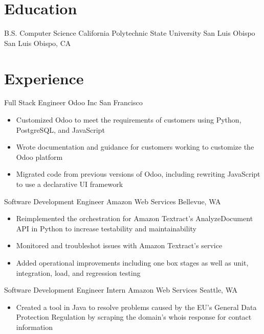 \documentclass[11pt,a4paper,sans,final]{moderncv}
\begin{document}
\makecvtitle
\begin{FlushLeft}
    \section{Education}
        {B.S. Computer Science}
        {California Polytechnic State University San Luis Obispo}
        {San Luis Obispo, CA}
        {}
        {}

    \section{Experience}
        {Full Stack Engineer}
        {Odoo Inc}
        {San Francisco}
        {}
        {
            \begin{itemize}
                \item Customized Odoo to meet the requirements of customers using Python, PostgreSQL, and JavaScript
                \item Wrote documentation and guidance for customers working to customize the Odoo platform
                \item Migrated code from previous versions of Odoo, including rewriting JavaScript to use a declarative UI framework
            \end{itemize}
        }
        {Software Development Engineer}
        {Amazon Web Services}
        {Bellevue, WA}
        {}
        {
            \begin{itemize}
                \item Reimplemented the orchestration for Amazon Textract's AnalyzeDocument API in Python to increase testability and maintainability
                \item Monitored and troubleshot issues with Amazon Textract's service
                \item Added operational improvements including one box stages as well as unit, integration, load, and regression testing
            \end{itemize}
        }
        {Software Development Engineer Intern}
        {Amazon Web Services}
        {Seattle, WA}
        {}
        {
            \begin{itemize}
                \item Created a tool in Java to resolve problems caused by the EU's General Data Protection Regulation by scraping the domain's whois response for contact information

\end{itemize}}
\end{FlushLeft}
\end{document}

